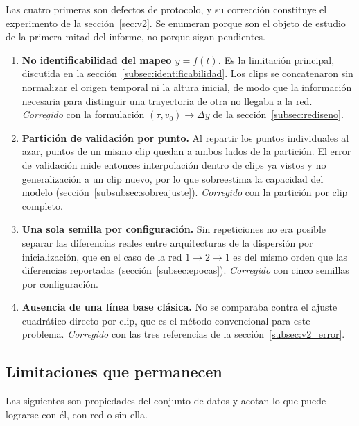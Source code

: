\documentclass[titlepage,11pt]{article}
\begin{document}
Las cuatro primeras son defectos de protocolo, y su corrección constituye el
experimento de la sección~\ref{sec:v2}. Se enumeran porque son el objeto de
estudio de la primera mitad del informe, no porque sigan pendientes.

\begin{enumerate}
\item \textbf{No identificabilidad del mapeo $y=f(t)$.} Es la limitación
  principal, discutida en la sección~\ref{subsec:identificabilidad}. Los clips
  se concatenaron sin normalizar el origen temporal ni la altura inicial, de
  modo que la información necesaria para distinguir una trayectoria de otra no
  llegaba a la red. \emph{Corregido} con la formulación $(\tau,v_0)\to\Delta y$
  de la sección~\ref{subsec:rediseno}.

\item \textbf{Partición de validación por punto.} Al repartir los puntos
  individuales al azar, puntos de un mismo clip quedan a ambos lados de la
  partición. El error de validación mide entonces interpolación dentro de clips
  ya vistos y no generalización a un clip nuevo, por lo que sobreestima la
  capacidad del modelo (sección~\ref{subsubsec:sobreajuste}). \emph{Corregido}
  con la partición por clip completo.

\item \textbf{Una sola semilla por configuración.} Sin repeticiones no era
  posible separar las diferencias reales entre arquitecturas de la dispersión
  por inicialización, que en el caso de la red $1\to2\to1$ es del mismo orden
  que las diferencias reportadas (sección~\ref{subsec:epocas}).
  \emph{Corregido} con cinco semillas por configuración.

\item \textbf{Ausencia de una línea base clásica.} No se comparaba contra el
  ajuste cuadrático directo por clip, que es el método convencional para este
  problema. \emph{Corregido} con las tres referencias de la
  sección~\ref{subsec:v2_error}.
\end{enumerate}

\subsection{Limitaciones que permanecen}

Las siguientes son propiedades del conjunto de datos y acotan lo que puede
lograrse con él, con red o sin ella.
\end{document}

